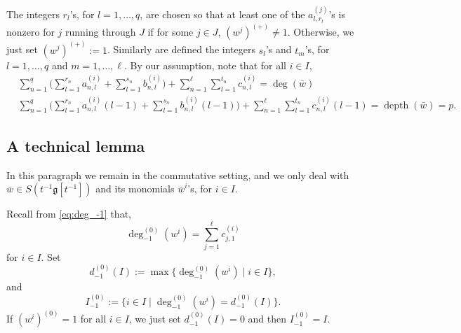 \documentclass[11pt]{article}
\numberwithin{equation}{section}
\DeclareMathOperator{\dep}{depth}
\newcommand \g{\mathfrak g}
\theoremstyle{definition}
\begin{document}
The integers $r_l$'s, for $l=1,\dots,q$, are chosen so that at least one of the
$a_{l,r_l}^{(j)}$'s is nonzero for $j$ running through $J$
if for some $j \in J$, $(w^{j})^{(+)}\not= 1$.
Otherwise, we just set $(w^{j})^{(+)} := 1$.
Similarly are defined the integers $s_l$'s and $t_m$'s,
for $l =1,\dots,q$ and $m=1,\dots,\ell$. By our assumption, note that for all $i \in I$,
\begin{align*}
& \sum_{n=1}^q \biggl(\sum_{l=1}^{r_n}
a_{n,l}^{(i)} + \sum_{l=1}^{s_n} b_{n,l}^{(i)} \biggr)
+ \sum_{n=1}^\ell \sum_{l=1}^{t_n} c_{n,l}^{(i)} = \deg(\bar w)&\\
& \sum_{n=1}^q \biggl(\sum_{l=1}^{r_n}
a_{n,l}^{(i)} (l-1) + \sum_{l=1}^{s_n} b_{n,l}^{(i)} (l-1) \biggr)
+ \sum_{n=1}^\ell \sum_{l=1}^{t_n} c_{n,l}^{(i)} (l-1)
= \dep(\bar w) = p.&
\end{align*}

\subsection{A technical lemma}
\label{sub:technical}
In this paragraph we remain in the commutative setting, and we only
deal with $\bar w \in S(t^{-1}\g[t^{-1}])$ and its monomials $\bar w^{i}$'s,
for $ i \in I$.

Recall from \eqref{eq:deg_-1} that,
\[
\deg_{-1}^{(0)}(w^i)= \sum_{j=1}^\ell c_{j,1}^{(i)}
\]
for $i \in I$.
Set
\[
d_{-1}^{(0)}(I) := \max\{\deg_{-1}^{(0)}(w^i) \mid i \in I\},
\]
and
\[
I_{-1}^{(0)} := \{ i\in I \mid \deg_{-1}^{(0)}(w^i)= d_{-1}^{(0)}(I)\}.
\]
If $(w^i)^{(0)}=1$ for all $i \in I$, we just set $d_{-1}^{(0)}(I)=0$
and then $I_{-1}^{(0)}=I$.
\end{document}
